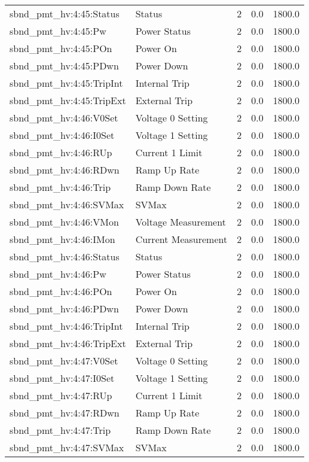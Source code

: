 \begin{center}
\begin{longtable}{l | l l l l }
sbnd\_pmt\_hv:4:45:Status & Status & 2 & 0.0 & 1800.0\\ 
sbnd\_pmt\_hv:4:45:Pw & Power Status & 2 & 0.0 & 1800.0\\ 
sbnd\_pmt\_hv:4:45:POn & Power On & 2 & 0.0 & 1800.0\\ 
sbnd\_pmt\_hv:4:45:PDwn & Power Down & 2 & 0.0 & 1800.0\\ 
sbnd\_pmt\_hv:4:45:TripInt & Internal Trip & 2 & 0.0 & 1800.0\\ 
sbnd\_pmt\_hv:4:45:TripExt & External Trip & 2 & 0.0 & 1800.0\\ 
sbnd\_pmt\_hv:4:46:V0Set & Voltage 0 Setting & 2 & 0.0 & 1800.0\\ 
sbnd\_pmt\_hv:4:46:I0Set & Voltage 1 Setting & 2 & 0.0 & 1800.0\\ 
sbnd\_pmt\_hv:4:46:RUp & Current 1 Limit & 2 & 0.0 & 1800.0\\ 
sbnd\_pmt\_hv:4:46:RDwn & Ramp Up Rate & 2 & 0.0 & 1800.0\\ 
sbnd\_pmt\_hv:4:46:Trip & Ramp Down Rate & 2 & 0.0 & 1800.0\\ 
sbnd\_pmt\_hv:4:46:SVMax & SVMax & 2 & 0.0 & 1800.0\\ 
sbnd\_pmt\_hv:4:46:VMon & Voltage Measurement & 2 & 0.0 & 1800.0\\ 
sbnd\_pmt\_hv:4:46:IMon & Current Measurement & 2 & 0.0 & 1800.0\\ 
sbnd\_pmt\_hv:4:46:Status & Status & 2 & 0.0 & 1800.0\\ 
sbnd\_pmt\_hv:4:46:Pw & Power Status & 2 & 0.0 & 1800.0\\ 
sbnd\_pmt\_hv:4:46:POn & Power On & 2 & 0.0 & 1800.0\\ 
sbnd\_pmt\_hv:4:46:PDwn & Power Down & 2 & 0.0 & 1800.0\\ 
sbnd\_pmt\_hv:4:46:TripInt & Internal Trip & 2 & 0.0 & 1800.0\\ 
sbnd\_pmt\_hv:4:46:TripExt & External Trip & 2 & 0.0 & 1800.0\\ 
sbnd\_pmt\_hv:4:47:V0Set & Voltage 0 Setting & 2 & 0.0 & 1800.0\\ 
sbnd\_pmt\_hv:4:47:I0Set & Voltage 1 Setting & 2 & 0.0 & 1800.0\\ 
sbnd\_pmt\_hv:4:47:RUp & Current 1 Limit & 2 & 0.0 & 1800.0\\ 
sbnd\_pmt\_hv:4:47:RDwn & Ramp Up Rate & 2 & 0.0 & 1800.0\\ 
sbnd\_pmt\_hv:4:47:Trip & Ramp Down Rate & 2 & 0.0 & 1800.0\\ 
sbnd\_pmt\_hv:4:47:SVMax & SVMax & 2 & 0.0 & 1800.0\\ 

\end{longtable}
\end{center}
